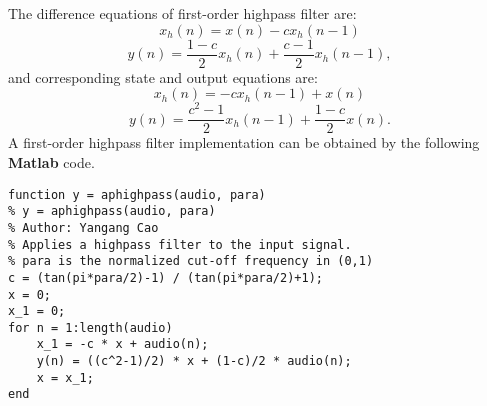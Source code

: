 \documentclass[10pt,a4paper,oneside]{article}
\begin{document}
The difference equations of first-order highpass filter are: 
\[
x_h(n) = x(n) - cx_h(n-1)
\]
\[
y(n) = \frac{1-c}{2}x_h(n) + \frac{c-1}{2}x_h(n-1),
\]
and corresponding state and output equations are:
\[
x_h(n) = -cx_h(n-1) +x(n)
\]
\[
y(n) = \frac{c^2-1}{2}x_h(n-1) + \frac{1-c}{2}x(n).
\]
A first-order highpass filter implementation can be obtained by the following {\bfseries Matlab} code.
\begin{lstlisting}
function y = aphighpass(audio, para)
% y = aphighpass(audio, para)
% Author: Yangang Cao
% Applies a highpass filter to the input signal.
% para is the normalized cut-off frequency in (0,1)
c = (tan(pi*para/2)-1) / (tan(pi*para/2)+1);
x = 0;
x_1 = 0;
for n = 1:length(audio)
	x_1 = -c * x + audio(n);
	y(n) = ((c^2-1)/2) * x + (1-c)/2 * audio(n);
	x = x_1;  
end
\end{lstlisting}
\end{document}
